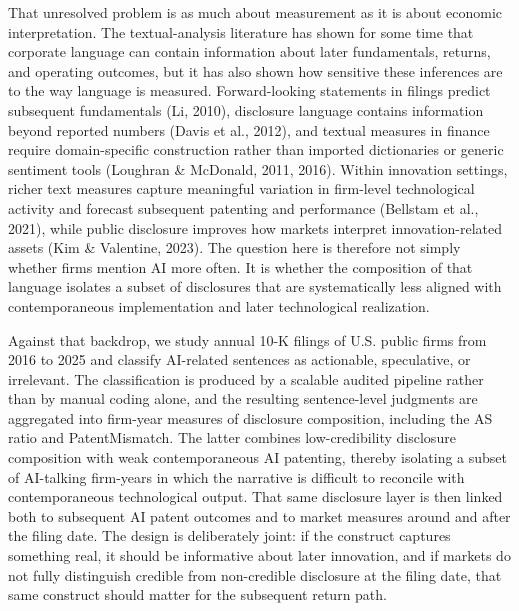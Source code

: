 That unresolved problem is as much about measurement as it is about economic interpretation. The textual-analysis literature has shown for some time that corporate language can contain information about later fundamentals, returns, and operating outcomes, but it has also shown how sensitive these inferences are to the way language is measured. Forward-looking statements in filings predict subsequent fundamentals (Li, 2010), disclosure language contains information beyond reported numbers (Davis et al., 2012), and textual measures in finance require domain-specific construction rather than imported dictionaries or generic sentiment tools (Loughran \& McDonald, 2011, 2016). Within innovation settings, richer text measures capture meaningful variation in firm-level technological activity and forecast subsequent patenting and performance (Bellstam et al., 2021), while public disclosure improves how markets interpret innovation-related assets (Kim \& Valentine, 2023). The question here is therefore not simply whether firms mention AI more often. It is whether the composition of that language isolates a subset of disclosures that are systematically less aligned with contemporaneous implementation and later technological realization.

Against that backdrop, we study annual 10-K filings of U.S. public firms from 2016 to 2025 and classify AI-related sentences as actionable, speculative, or irrelevant. The classification is produced by a scalable audited pipeline rather than by manual coding alone, and the resulting sentence-level judgments are aggregated into firm-year measures of disclosure composition, including the AS ratio and PatentMismatch. The latter combines low-credibility disclosure composition with weak contemporaneous AI patenting, thereby isolating a subset of AI-talking firm-years in which the narrative is difficult to reconcile with contemporaneous technological output. That same disclosure layer is then linked both to subsequent AI patent outcomes and to market measures around and after the filing date. The design is deliberately joint: if the construct captures something real, it should be informative about later innovation, and if markets do not fully distinguish credible from non-credible disclosure at the filing date, that same construct should matter for the subsequent return path.


